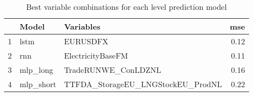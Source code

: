 \begin{table}[ht]
\centering
\begin{tabular}{rllr}
  \hline
 & Model & Variables & mse \\ 
  \hline
1 & lstm & EURUSDFX & 0.12 \\ 
  2 & rnn & ElectricityBaseFM & 0.11 \\ 
  3 & mlp\_long & TradeRUNWE\_ConLDZNL & 0.16 \\ 
  4 & mlp\_short & TTFDA\_StorageEU\_LNGStockEU\_ProdNL & 0.22 \\ 
   \hline
\end{tabular}
\caption{Best variable combinations for each level prediction model} 
\label{tab:best_models}
\end{table}
